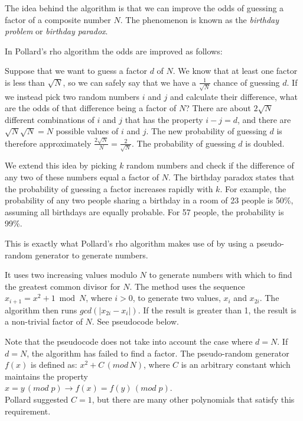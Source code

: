 \documentclass[paper=a4, fontsize=11pt,numbers=endperiod]{scrartcl} %
\providecommand{\abs}[1]{\lvert#1\rvert} %
\numberwithin{equation}{section} %
\numberwithin{figure}{section} %
\numberwithin{table}{section} %
\begin{document}
The idea behind the algorithm is that we can improve the odds of guessing a factor of a composite number $N$.
The phenomenon is known as the \emph{birthday problem} or \emph{birthday paradox}\cite{birthday}.

In Pollard's rho algorithm the odds are improved as follows:

Suppose that we want to guess a factor $d$ of $N$.
We know that at least one factor is less than $\sqrt{N}$, so we can safely say that we have a $\frac{1}{\sqrt{N}}$ chance of guessing $d$.
If we instead pick two random numbers $i$ and $j$ and calculate their difference, what are the odds of that difference being a factor of $N$? There are about $2\sqrt{N}$ different combinations of $i$ and $j$ that has the property $i - j = d$, and there are $\sqrt{N}\sqrt{N} = N$ possible values of $i$ and $j$.
The new probability of guessing $d$ is therefore approximately $\frac{2\sqrt{N}}{N} = \frac{2}{\sqrt{N}}$.
The probability of guessing $d$ is doubled.\cite{colorado}

We extend this idea by picking $k$ random numbers and check if the difference of any two of these numbers equal a factor of $N$.
The birthday paradox states that the probability of guessing a factor increases rapidly with $k$.
For example, the probability of any two people sharing a birthday in a room of 23 people is 50\%, assuming all birthdays are equally probable.
For 57 people, the probability is 99\%.

This is exactly what Pollard's rho algorithm makes use of by using a pseudo-random generator to generate numbers.

It uses two increasing values modulo $N$ to generate numbers with which to find the greatest common divisor for $N$.
The method uses the sequence $x_{i+1} = x^2 + 1 \bmod N$, where $i > 0$, to generate two values, $x_i$ and $x_{2i}$.
The algorithm then runs $gcd(\abs{x_{2i}-x_i})$.
If the result is greater than 1, the result is a non-trivial factor of $N$.
See pseudocode below.


Note that the pseudocode does not take into account the case where $d = N$.
If $d = N$, the algorithm has failed to find a factor.
The pseudo-random generator $f(x)$ is defined as: $x^2+C\, (mod\, N)$, where $C$ is an arbitrary constant which maintains the property\\ $x = y\, (mod\; p) \rightarrow f(x) = f(y)\,(mod\; p)$.\\ Pollard suggested $C = 1$, but there are many other polynomials that satisfy this requirement.\\ %
\end{document}

